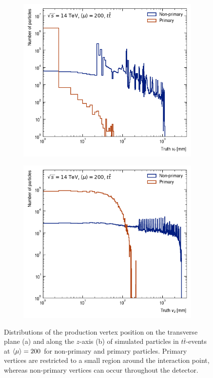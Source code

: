 \begin{figure}[h!]
\begin{subfigure}[b]{0.49\textwidth}
    \centering
    \includegraphics[width=\textwidth]{figures/vr-hist.png}
    \caption{}
    \label{subfig:radius-spectrum}
\end{subfigure}
\begin{subfigure}[b]{0.49\textwidth}
    \centering
    \includegraphics[width=\textwidth]{figures/vz-hist.png}
    \caption{}
    \label{subfig:z-spectrum}
\end{subfigure}
    \caption{Distributions of the production vertex position on the transverse plane (a) and along the $z$-axis (b) of simulated particles in $t\bar{t}$-events at $\expval{\mu}=200$ for non-primary and primary particles. Primary vertices are restricted to a small region around the interaction point, whereas non-primary vertices can occur throughout the detector.}
    \label{fig:vertex-spectrum}
\end{figure}

